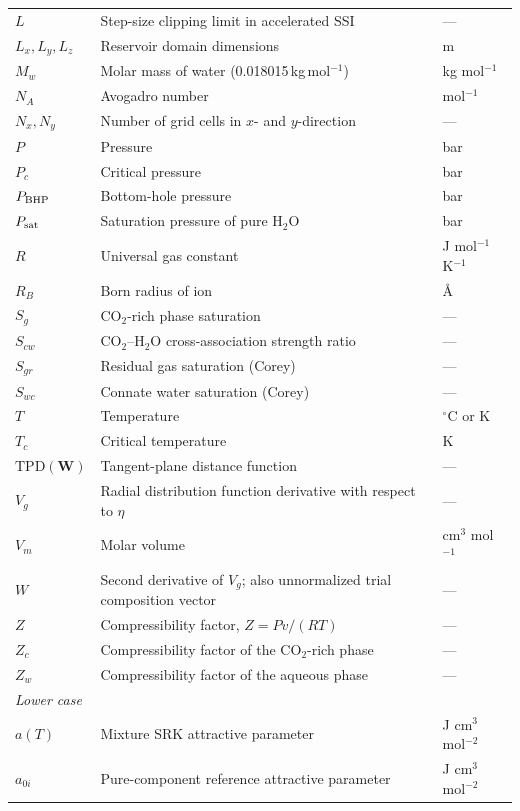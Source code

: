 \documentclass[preprint,12pt,authoryear]{elsarticle}
\begin{document}
\begin{longtable}{@{}p{}p{}p{}@{}}
  $L$ & Step-size clipping limit in accelerated SSI & --- \\
  $L_x, L_y, L_z$ & Reservoir domain dimensions & m \\
  $M_w$ & Molar mass of water (0.018015\,kg\,mol$^{-1}$) & kg mol$^{-1}$ \\
  $N_A$ & Avogadro number & mol$^{-1}$ \\
  $N_x, N_y$ & Number of grid cells in $x$- and $y$-direction & --- \\
  $P$ & Pressure & bar \\
  $P_c$ & Critical pressure & bar \\
  $P_{\rm BHP}$ & Bottom-hole pressure & bar \\
  $P_{\rm sat}$ & Saturation pressure of pure H$_2$O & bar \\
  $R$ & Universal gas constant & J mol$^{-1}$ K$^{-1}$ \\
  $R_B$ & Born radius of ion & \AA \\
  $S_g$ & CO$_2$-rich phase saturation & --- \\
  $S_{cw}$ & CO$_2$--H$_2$O cross-association strength ratio & --- \\
  $S_{gr}$ & Residual gas saturation (Corey) & --- \\
  $S_{wc}$ & Connate water saturation (Corey) & --- \\
  $T$ & Temperature & $^\circ$C or K \\
  $T_c$ & Critical temperature & K \\
  $\text{TPD}(\mathbf{W})$ & Tangent-plane distance function & --- \\
  $V_g$ & Radial distribution function derivative with respect to $\eta$ & --- \\
  $V_m$ & Molar volume & cm$^3$ mol$^{-1}$ \\
  $W$ & Second derivative of $V_g$; also unnormalized trial composition vector & --- \\
  $Z$ & Compressibility factor, $Z = Pv/(RT)$ & --- \\
  $Z_c$ & Compressibility factor of the CO$_2$-rich phase & --- \\
  $Z_w$ & Compressibility factor of the aqueous phase & --- \\[4pt]
  \multicolumn{3}{l}{\textit{Lower case}} \\[2pt]
  $a(T)$ & Mixture SRK attractive parameter & J cm$^3$ mol$^{-2}$ \\
  $a_{0i}$ & Pure-component reference attractive parameter & J cm$^3$ mol$^{-2}$ \\

\end{longtable}
\end{document}

